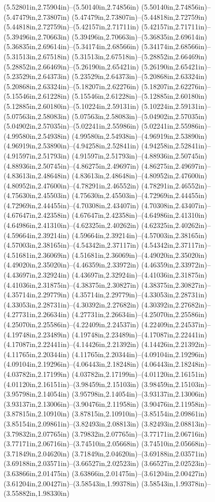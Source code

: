 (5.52801in,2.75904in)--(5.50140in,2.74856in) (5.50140in,2.74856in)--(5.47479in,2.73807in) (5.47479in,2.73807in)--(5.44818in,2.72759in) (5.44818in,2.72759in)--(5.42157in,2.71711in) (5.42157in,2.71711in)--(5.39496in,2.70663in) (5.39496in,2.70663in)--(5.36835in,2.69614in) (5.36835in,2.69614in)--(5.34174in,2.68566in) (5.34174in,2.68566in)--(5.31513in,2.67518in) (5.31513in,2.67518in)--(5.28852in,2.66469in) (5.28852in,2.66469in)--(5.26190in,2.65421in) (5.26190in,2.65421in)--(5.23529in,2.64373in) (5.23529in,2.64373in)--(5.20868in,2.63324in) (5.20868in,2.63324in)--(5.18207in,2.62276in) (5.18207in,2.62276in)--(5.15546in,2.61228in) (5.15546in,2.61228in)--(5.12885in,2.60180in) (5.12885in,2.60180in)--(5.10224in,2.59131in) (5.10224in,2.59131in)--(5.07563in,2.58083in) (5.07563in,2.58083in)--(5.04902in,2.57035in) (5.04902in,2.57035in)--(5.02241in,2.55986in) (5.02241in,2.55986in)--(4.99580in,2.54938in) (4.99580in,2.54938in)--(4.96919in,2.53890in) (4.96919in,2.53890in)--(4.94258in,2.52841in) (4.94258in,2.52841in)--(4.91597in,2.51793in) (4.91597in,2.51793in)--(4.88936in,2.50745in) (4.88936in,2.50745in)--(4.86275in,2.49697in) (4.86275in,2.49697in)--(4.83613in,2.48648in) (4.83613in,2.48648in)--(4.80952in,2.47600in) (4.80952in,2.47600in)--(4.78291in,2.46552in) (4.78291in,2.46552in)--(4.75630in,2.45503in) (4.75630in,2.45503in)--(4.72969in,2.44455in) (4.72969in,2.44455in)--(4.70308in,2.43407in) (4.70308in,2.43407in)--(4.67647in,2.42358in) (4.67647in,2.42358in)--(4.64986in,2.41310in) (4.64986in,2.41310in)--(4.62325in,2.40262in) (4.62325in,2.40262in)--(4.59664in,2.39214in) (4.59664in,2.39214in)--(4.57003in,2.38165in) (4.57003in,2.38165in)--(4.54342in,2.37117in) (4.54342in,2.37117in)--(4.51681in,2.36069in) (4.51681in,2.36069in)--(4.49020in,2.35020in) (4.49020in,2.35020in)--(4.46359in,2.33972in) (4.46359in,2.33972in)--(4.43697in,2.32924in) (4.43697in,2.32924in)--(4.41036in,2.31875in) (4.41036in,2.31875in)--(4.38375in,2.30827in) (4.38375in,2.30827in)--(4.35714in,2.29779in) (4.35714in,2.29779in)--(4.33053in,2.28731in) (4.33053in,2.28731in)--(4.30392in,2.27682in) (4.30392in,2.27682in)--(4.27731in,2.26634in) (4.27731in,2.26634in)--(4.25070in,2.25586in) (4.25070in,2.25586in)--(4.22409in,2.24537in) (4.22409in,2.24537in)--(4.19748in,2.23489in) (4.19748in,2.23489in)--(4.17087in,2.22441in) (4.17087in,2.22441in)--(4.14426in,2.21392in) (4.14426in,2.21392in)--(4.11765in,2.20344in) (4.11765in,2.20344in)--(4.09104in,2.19296in) (4.09104in,2.19296in)--(4.06443in,2.18248in) (4.06443in,2.18248in)--(4.03782in,2.17199in) (4.03782in,2.17199in)--(4.01120in,2.16151in) (4.01120in,2.16151in)--(3.98459in,2.15103in) (3.98459in,2.15103in)--(3.95798in,2.14054in) (3.95798in,2.14054in)--(3.93137in,2.13006in) (3.93137in,2.13006in)--(3.90476in,2.11958in) (3.90476in,2.11958in)--(3.87815in,2.10910in) (3.87815in,2.10910in)--(3.85154in,2.09861in) (3.85154in,2.09861in)--(3.82493in,2.08813in) (3.82493in,2.08813in)--(3.79832in,2.07765in) (3.79832in,2.07765in)--(3.77171in,2.06716in) (3.77171in,2.06716in)--(3.74510in,2.05668in) (3.74510in,2.05668in)--(3.71849in,2.04620in) (3.71849in,2.04620in)--(3.69188in,2.03571in) (3.69188in,2.03571in)--(3.66527in,2.02523in) (3.66527in,2.02523in)--(3.63866in,2.01475in) (3.63866in,2.01475in)--(3.61204in,2.00427in) (3.61204in,2.00427in)--(3.58543in,1.99378in) (3.58543in,1.99378in)--(3.55882in,1.98330in) 